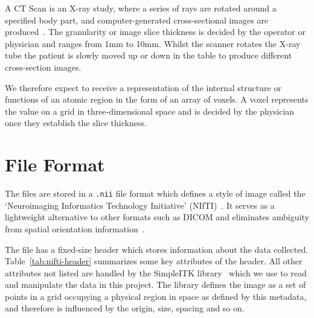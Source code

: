 \documentclass[11pt,twoside]{report}
\begin{document}
A CT Scan is an X-ray study, where a series of rays are rotated around a specified body part, and computer-generated cross-sectional images are produced~\cite{file-formats}. The granularity or image slice thickness is decided by the operator or physician and ranges from 1mm to 10mm. Whilst the scanner rotates the X-ray tube the patient is slowly moved up or down in the table to produce different cross-section images.

We therefore expect to receive a representation of the internal structure or functions of an atomic region in the form of an array of voxels. A voxel represents the value on a grid in three-dimensional space and is decided by the physician once they establish the slice thickness.

\section{File Format}\label{sec:data-file-format}

The files are stored in a \texttt{.nii} file format which defines a style of image called the `Neuroimaging Informatics Technology Initiative' (NIfTI)~\cite{file-formats}. It serves as a lightweight alternative to other formats such as DICOM and eliminates ambiguity from spatial orientation information~\cite{dicom-to-nifti-conversion}.

The file has a fixed-size header which stores information about the data collected. Table~\ref{tab:nifti-header} summarizes some key attributes of the header. All other attributes not listed are handled by the SimpleITK library~\cite{SimpleITK-paper} which we use to read and manipulate the data in this project. The library defines the image as a set of points in a grid occupying a physical region in space as defined by this metadata, and therefore is influenced by the origin, size, spacing and so on.
\end{document}
